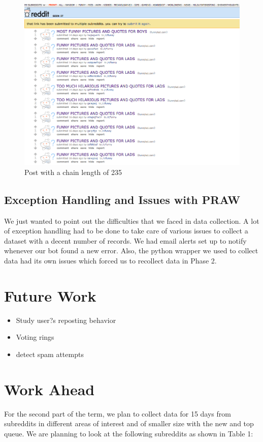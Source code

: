 \documentclass{article} %
\begin{document}
\begin{figure}[h]
\begin{center}
\includegraphics[width=5in]{funny.png}
\caption{Post with a chain length of 235}
\end{center}
\end{figure}

\subsection{Exception Handling and Issues with PRAW}

We just wanted to point out the difficulties that we faced in data collection. A lot of exception handling had to be done to take care of various issues to collect a dataset with a decent number of records. We had email alerts set up to notify whenever our bot found a new error. Also, the python wrapper we used to collect data had its own issues which forced us to recollect data in Phase 2.

\section{Future Work}

\begin{itemize}
\item Study user?s reposting behavior
\item Voting rings
\item detect spam attempts
\end{itemize}

\section{Work Ahead}
For the second part of the term, we plan to collect data for 15 days from subreddits in different areas of interest and of smaller size with the new and top queue. We are planning to look at the following subreddits as shown in Table 1:
\end{document}
